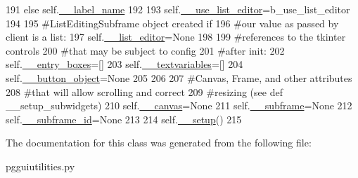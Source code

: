 \begin{DoxyCode}
191                                         \textcolor{keywordflow}{else} self.\hyperlink{classnegui_1_1pgguiutilities_1_1KeyValFrame_a712bc54aa2ed3383fc4fe78943ed2ccb}{\_\_label\_name}
192 
193         self.\hyperlink{classnegui_1_1pgguiutilities_1_1KeyValFrame_ac5f010d35ad130077b2dc26001f4267a}{\_\_use\_list\_editor}=b\_use\_list\_editor
194 
195         \textcolor{comment}{#ListEditingSubframe object created if}
196         \textcolor{comment}{#our value as passed by client is a list:}
197         self.\hyperlink{classnegui_1_1pgguiutilities_1_1KeyValFrame_a7c41f848553b931f4d4410746f536e80}{\_\_list\_editor}=\textcolor{keywordtype}{None}
198 
199         \textcolor{comment}{#references to the tkinter controls}
200         \textcolor{comment}{#that may be subject to config}
201         \textcolor{comment}{#after init:}
202         self.\hyperlink{classnegui_1_1pgguiutilities_1_1KeyValFrame_aca02061228a06555b1089c0f29e76c16}{\_\_entry\_boxes}=[]
203         self.\hyperlink{classnegui_1_1pgguiutilities_1_1KeyValFrame_a4c7f885ec8170c01e0518a3ce9f83825}{\_\_textvariables}=[]
204         self.\hyperlink{classnegui_1_1pgguiutilities_1_1KeyValFrame_a81a445bf0dde094f7a637862633f326d}{\_\_button\_object}=\textcolor{keywordtype}{None}
205 
206         
207         \textcolor{comment}{#Canvas, Frame, and other attributes}
208         \textcolor{comment}{#that will allow scrolling and correct}
209         \textcolor{comment}{#resizing (see def \_\_setup\_subwidgets)}
210         self.\hyperlink{classnegui_1_1pgguiutilities_1_1KeyValFrame_a84a06231bb7ea897130918df961a8b7a}{\_\_canvas}=\textcolor{keywordtype}{None}
211         self.\hyperlink{classnegui_1_1pgguiutilities_1_1KeyValFrame_a235e50f36bb184384f5890419a5fbe6b}{\_\_subframe}=\textcolor{keywordtype}{None}
212         self.\hyperlink{classnegui_1_1pgguiutilities_1_1KeyValFrame_a142189024bf58f59618aa83128270459}{\_\_subframe\_id}=\textcolor{keywordtype}{None}
213         
214         self.\hyperlink{classnegui_1_1pgguiutilities_1_1KeyValFrame_a9d6430a9f908364c1f00e07b47dcbff5}{\_\_setup}()
215 
\end{DoxyCode}


The documentation for this class was generated from the following file\+:\begin{DoxyCompactItemize}
\item 
pgguiutilities.\+py\end{DoxyCompactItemize}
